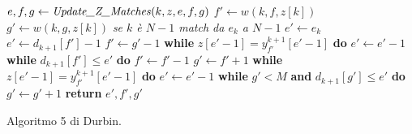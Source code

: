 \begin{algorithm}
  \begin{algorithmic}[1]   
    \State $e,f,g\gets \mbox{\textit{Update\_Z\_Matches}}(k, z, e, f, g)$
    \EndFor
    \EndFunction
    \State
    \State $f'\gets w(k, f, z[k])$
    \State $g'\gets w(k, g, z[k])$
    \Comment\textit{{se $k$ è $N-1$ match da $e_k$ a $N-1$}}
    \State $e'\gets e_k$
    \Else
    \State $e'\gets d_{k+1}[f']-1$
    \State $f'\gets g'-1$
    \State \textbf{while} $z[e'-1]=y_{f'}^{k+1}[e'-1]$ \textbf{do} $e'\gets
    e'-1$
    \State \textbf{while} $d_{k+1}[f']\leq e'$ \textbf{do} $f'\gets f'-1$
    \Else
    \State $g'\gets f'+1$
    \State \textbf{while} $z[e'-1]=y_{f'}^{k+1}[e'-1]$ \textbf{do}  $e'\gets
    e'-1$ 
    \State \textbf{while} $g'<M$ \textbf{and} $d_{k+1}[g']\leq e'$ \textbf{do}
    $g'\gets g'+1$ 
    \EndIf
    \EndIf
    \State \textbf{return} $e',f',g'$
    \EndFunction
  \end{algorithmic}
  \caption{Algoritmo 5 di Durbin.}
  \label{algo:dur5}
\end{algorithm}
